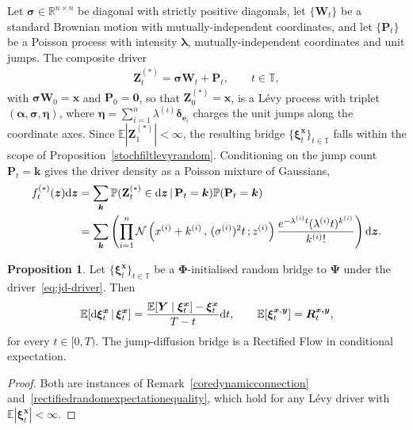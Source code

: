 \documentclass{article}
\newcommand{\levy}{{L\'evy }}
\def\R{\mathbb{R}}
\def\E{\mathbb{E}}
\def\T{\mathbb{T}}
\def\dd{\mathrm{d}}
\def\xib{\boldsymbol{\xi}}
\theoremstyle{definition}
\newtheorem{proposition}{Proposition}[section]
\begin{document}
Let $\boldsymbol{\sigma}\in\R^{n\times n}$ be diagonal with strictly positive diagonals, let
$\{\mathbf{W}_t\}$ be a standard Brownian motion with mutually-independent coordinates, and let
$\{\mathbf{P}_t\}$ be a Poisson process with intensity $\boldsymbol{\lambda}$, mutually-independent
coordinates and unit jumps. The composite driver
\begin{align}
\label{eq:jd-driver}
\mathbf{Z}^{(*)}_t = \boldsymbol{\sigma}\mathbf{W}_t + \mathbf{P}_t, \qquad t\in\T,
\end{align}
with $\boldsymbol{\sigma}\mathbf{W}_0=\boldsymbol{x}$ and $\mathbf{P}_0=\boldsymbol{0}$, so that
$\mathbf{Z}^{(*)}_0=\boldsymbol{x}$, is a \levy process with triplet
$(\boldsymbol{\alpha},\boldsymbol{\sigma},\boldsymbol{\eta})$, where
$\boldsymbol{\eta}=\sum_{i=1}^n\lambda^{(i)}\boldsymbol{\delta}_{\boldsymbol{e}_i}$ charges the unit
jumps along the coordinate axes. Since $\E|\mathbf{Z}^{(*)}_1|<\infty$, the resulting bridge
$\{\xib^{\boldsymbol{x}}_t\}_{t\in\T}$ falls within the scope of Proposition~\ref{stochfiltlevyrandom}.
Conditioning on the jump count $\mathbf{P}_t=\boldsymbol{k}$ gives the driver density as a Poisson
mixture of Gaussians,
\begin{align}
f_t^{(*)}(\boldsymbol{z})\dd \boldsymbol{z} &= \sum_{\boldsymbol{k}} \mathbb{P}(\mathbf{Z}^{(*)}_t \in \dd \boldsymbol{z} \, | \, \mathbf{P}_t = \boldsymbol{k})\mathbb{P}(\mathbf{P}_t = \boldsymbol{k}) \notag \\
& = \sum_{\boldsymbol{k}}\left(\prod_{i=1}^n \mathcal{N}\left(x^{(i)} + k^{(i)} \, , \, (\sigma^{(i)})^2t \, ; z^{(i)}\right) \frac{e^{-\lambda^{(i)}t}(\lambda^{(i)}t)^{k^{(i)}}}{k^{(i)}!}\right)\dd \boldsymbol{z}. \label{jumpdiffusiondensity}
\end{align}
\begin{proposition}
\label{prop:jd-universal}
Let $\{\xib^{\boldsymbol{x}}_t\}_{t\in\T}$ be a $\boldsymbol{\Phi}$-initialised random bridge to
$\boldsymbol{\Psi}$ under the driver~\eqref{eq:jd-driver}. Then
\begin{align}
\E\!\left[\dd\xib^{\boldsymbol{x}}_t\,\middle|\,\xib^{\boldsymbol{x}}_t\right]
 = \frac{\E[\boldsymbol{Y}\mid\xib^{\boldsymbol{x}}_t]-\xib^{\boldsymbol{x}}_t}{T-t}\dd t,
\qquad
\E\!\left[\xib^{\boldsymbol{x},\boldsymbol{y}}_t\right]=\boldsymbol{R}^{\boldsymbol{x,y}}_t, \notag
\end{align}
for every $t\in[0,T)$. The jump-diffusion bridge is a Rectified Flow in conditional expectation.
\end{proposition}
\begin{proof}
Both are instances of Remark~\ref{coredynamicconnection} and~\eqref{rectifiedrandomexpectationequality},
which hold for any \levy driver with $\E|\xib^{\boldsymbol{x}}_t|<\infty$.
\end{proof}
\end{document}
